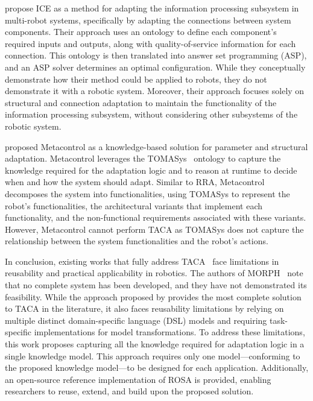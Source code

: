 \mbox{\cite{stefan_adaptive_runtime_models, p20_stefan_ice}} propose ICE as a method for adapting the information processing subsystem in multi-robot systems, specifically by adapting the connections between system components. Their approach uses an ontology to define each component's required inputs and outputs, along with quality-of-service information for each connection. This ontology is then translated into answer set programming (ASP), and an ASP solver determines an optimal configuration. While they conceptually demonstrate how their method could be applied to robots, they do not demonstrate it with a robotic system. Moreover, their approach focuses solely on structural and connection adaptation to maintain the functionality of the information processing subsystem, without considering other subsystems of the robotic system.

\mbox{\cite{hernandez2018self, bozhinoski2022mros}} proposed Metacontrol as a knowledge-based solution for parameter and structural adaptation. Metacontrol leverages the TOMASys~\citep{hernandez2018self} ontology to capture the knowledge required for the adaptation logic and to reason at runtime to decide when and how the system should adapt. Similar to RRA, Metacontrol decomposes the system into functionalities, using TOMASys to represent the robot's functionalities, the architectural variants that implement each functionality, and the non-functional requirements associated with these variants. However, Metacontrol cannot perform TACA as TOMASys does not capture the relationship between the system functionalities and the robot's actions.

In conclusion, existing works that fully address TACA~\mbox{\citep{braberman2018extended, CAMARASoftwareArchitectureTask2020}} face limitations in reusability and practical applicability in robotics. The authors of MORPH~\mbox{\citep{braberman2018extended}} note that no complete system has been developed, and they have not demonstrated its feasibility. While the approach proposed by \mbox{\cite{CAMARASoftwareArchitectureTask2020}} provides the most complete solution to TACA in the literature, it also faces reusability limitations by relying on multiple distinct domain-specific language (DSL) models and requiring task-specific implementations for model transformations. To address these limitations, this work proposes capturing all the knowledge required for adaptation logic in a single knowledge model. This approach requires only one model---conforming to the proposed knowledge model---to be designed for each application. Additionally, an open-source reference implementation of ROSA is provided, enabling researchers to reuse, extend, and build upon the proposed solution.

